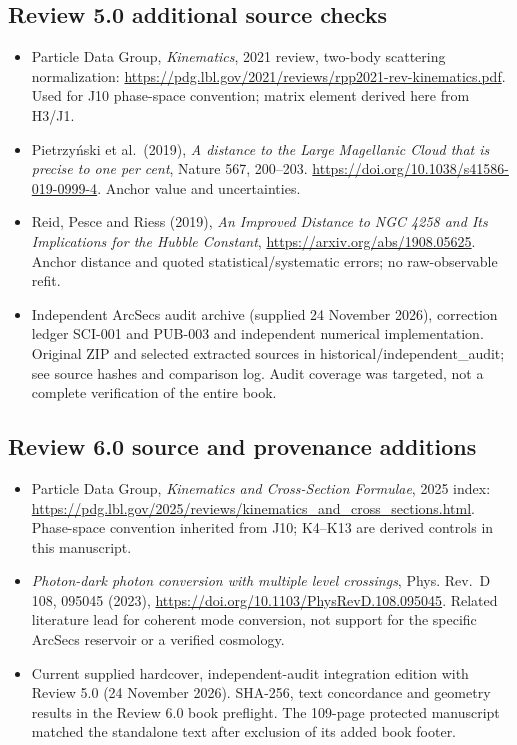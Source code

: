 \documentclass[
  11pt,
  twoside]{article}
\providecommand{\tightlist}{%
  \setlength{\itemsep}{0pt}\setlength{\parskip}{0pt}}
\begin{document}
\subsection{Review 5.0 additional source
checks}\label{review-5.0-additional-source-checks}

\begin{itemize}
\tightlist
\item
  Particle Data Group, \emph{Kinematics}, 2021 review, two-body
  scattering normalization:
  \url{https://pdg.lbl.gov/2021/reviews/rpp2021-rev-kinematics.pdf}.
  Used for J10 phase-space convention; matrix element derived here from
  H3/J1.
\item
  Pietrzyński et al.~(2019), \emph{A distance to the Large Magellanic
  Cloud that is precise to one per cent}, Nature 567, 200--203.
  \url{https://doi.org/10.1038/s41586-019-0999-4}. Anchor value and
  uncertainties.
\item
  Reid, Pesce and Riess (2019), \emph{An Improved Distance to NGC 4258
  and Its Implications for the Hubble Constant},
  \url{https://arxiv.org/abs/1908.05625}. Anchor distance and quoted
  statistical/systematic errors; no raw-observable refit.
\item
  Independent ArcSecs audit archive (supplied 24 November 2026),
  correction ledger SCI-001 and PUB-003 and independent numerical
  implementation. Original ZIP and selected extracted sources in
  historical/independent\_audit; see source hashes and comparison log.
  Audit coverage was targeted, not a complete verification of the entire
  book.
\end{itemize}

\subsection{Review 6.0 source and provenance
additions}\label{review-6.0-source-and-provenance-additions}

\begin{itemize}
\tightlist
\item
  Particle Data Group, \emph{Kinematics and Cross-Section Formulae},
  2025 index:
  \url{https://pdg.lbl.gov/2025/reviews/kinematics_and_cross_sections.html}.
  Phase-space convention inherited from J10; K4--K13 are derived
  controls in this manuscript.
\item
  \emph{Photon-dark photon conversion with multiple level crossings},
  Phys. Rev.~D 108, 095045 (2023),
  \url{https://doi.org/10.1103/PhysRevD.108.095045}. Related literature
  lead for coherent mode conversion, not support for the specific
  ArcSecs reservoir or a verified cosmology.
\item
  Current supplied hardcover, independent-audit integration edition with
  Review 5.0 (24 November 2026). SHA-256, text concordance and geometry
  results in the Review 6.0 book preflight. The 109-page protected
  manuscript matched the standalone text after exclusion of its added
  book footer.
\end{itemize}
\end{document}
